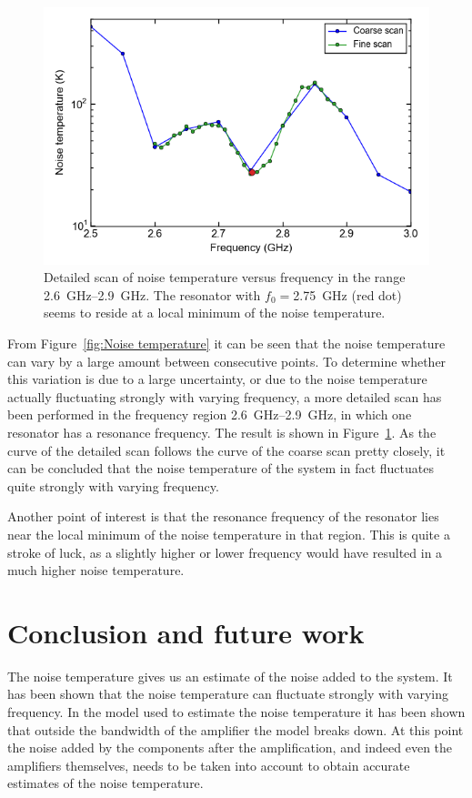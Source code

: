 \begin{figure}[h]
    \centering
    \includegraphics[width = .6\linewidth]{Figures/Noise/noise_temperature_versus_power_detailed.png}
    \caption{Detailed scan of noise temperature versus frequency in the range \SIrange{2.6}{2.9}{\giga \hertz}. The resonator with $f_0 = $\SI{2.75}{\giga \hertz} (red dot) seems to reside at a local minimum of the noise temperature.}
    \label{fig:noise temperature 2GHz}
\end{figure}

From Figure~\ref{fig:Noise temperature} it can be seen that the noise temperature can vary by a large amount between consecutive points. To determine whether this variation is due to a large uncertainty, or due to the noise temperature actually fluctuating strongly with varying frequency, a more detailed scan has been performed in the frequency region \SIrange{2.6}{2.9}{\giga \hertz}, in which one resonator has a resonance frequency. The result is shown in Figure~\ref{fig:noise temperature 2GHz}. As the curve of the detailed scan follows the curve of the coarse scan pretty closely, it can be concluded that the noise temperature of the system in fact fluctuates quite strongly with varying frequency.

Another point of interest is that the resonance frequency of the resonator lies near the local minimum of the noise temperature in that region. This is quite a stroke of luck, as a slightly higher or lower frequency would have resulted in a much higher noise temperature.



\section{Conclusion and future work}

The noise temperature gives us an estimate of the noise added to the system. It has been shown that the noise temperature can fluctuate strongly with varying frequency. In the model used to estimate the noise temperature it has been shown that outside the bandwidth of the amplifier the model breaks down. At this point the noise added by the components after the amplification, and indeed even the amplifiers themselves, needs to be taken into account to obtain accurate estimates of the noise temperature.

